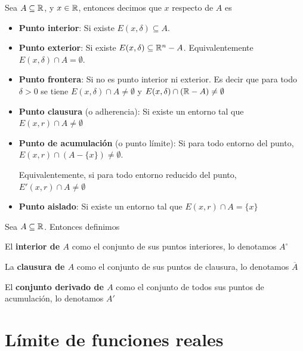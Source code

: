 \begin{definition}[Puntos] \label{clasif_topo_puntos_r}
	
Sea $A \subseteq \mathbb{R}$, y $x \in \mathbb{R}$, entonces decimos que $x$ respecto de $A$ es 
	
\begin{itemize}
\item \textbf{Punto interior}: Si existe $E(x,\delta) \subseteq A$.
		
\item \textbf{Punto exterior}: Si existe $E(x,\delta) \subseteq \mathbb{R}^n - A$.  Equivalentemente $E(x,\delta) \cap A = \emptyset$.
		
\item \textbf{Punto frontera}: Si no es punto interior ni exterior.  Es decir que para todo $ \delta > 0$ se tiene $E(x,\delta) \cap A \neq \emptyset$ y $E(x,\delta) \cap (\mathbb{R} - A) \neq \emptyset$
		
\item \textbf{Punto clausura} (o adherencia): Si existe un entorno tal que $E(x,r) \cap A \neq \emptyset$
		
\item \textbf{Punto de acumulación} (o punto límite): Si para todo entorno del punto, $ E(x,r) \cap (A - \{x\}) \neq \emptyset$.
		
Equivalentemente, si para todo entorno reducido del punto, $ E'(x,r) \cap A \neq \emptyset$
		
\item \textbf{Punto aislado}: Si existe un entorno tal que $E(x,r) \cap A = \{x\}$
\end{itemize}
\end{definition}

\begin{definition}[Interior] \label{conjunto_interior_r}
Sea $A \subseteq \mathbb{R}$.  Entonces definimos
	
El \textbf{interior de $A$} como el conjunto de sus puntos interiores, lo denotamos $A^{\circ}$
	
La \textbf{clausura de $A$} como el conjunto de sus puntos de clausura, lo denotamos $\overline{A}$
	
El \textbf{conjunto derivado de $A$} como el conjunto de todos sus puntos de acumulación, lo denotamos $A'$
\end{definition}

\chapter{Límite de funciones reales}




